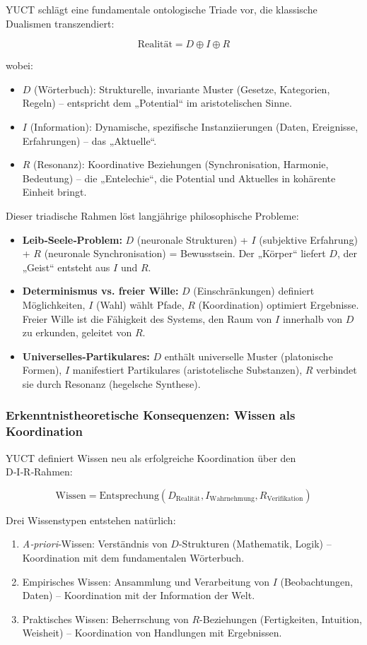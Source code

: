 \documentclass[12pt,a4paper]{article}
\begin{document}
	YUCT schlägt eine fundamentale ontologische Triade vor, die klassische Dualismen transzendiert:
	
	\[
	\text{Realität} = D \oplus I \oplus R
	\]
	
	wobei:
	\begin{itemize}
		\item $D$ (Wörterbuch): Strukturelle, invariante Muster (Gesetze, Kategorien, Regeln) – entspricht dem „Potential“ im aristotelischen Sinne.
		\item $I$ (Information): Dynamische, spezifische Instanziierungen (Daten, Ereignisse, Erfahrungen) – das „Aktuelle“.
		\item $R$ (Resonanz): Koordinative Beziehungen (Synchronisation, Harmonie, Bedeutung) – die „Entelechie“, die Potential und Aktuelles in kohärente Einheit bringt.
	\end{itemize}
	
	Dieser triadische Rahmen löst langjährige philosophische Probleme:
	
	\begin{itemize}
		\item \textbf{Leib‑Seele‑Problem:} $D$ (neuronale Strukturen) + $I$ (subjektive Erfahrung) + $R$ (neuronale Synchronisation) = Bewusstsein. Der „Körper“ liefert $D$, der „Geist“ entsteht aus $I$ und $R$.
		\item \textbf{Determinismus vs. freier Wille:} $D$ (Einschränkungen) definiert Möglichkeiten, $I$ (Wahl) wählt Pfade, $R$ (Koordination) optimiert Ergebnisse. Freier Wille ist die Fähigkeit des Systems, den Raum von $I$ innerhalb von $D$ zu erkunden, geleitet von $R$.
		\item \textbf{Universelles‑Partikulares:} $D$ enthält universelle Muster (platonische Formen), $I$ manifestiert Partikulares (aristotelische Substanzen), $R$ verbindet sie durch Resonanz (hegelsche Synthese).
	\end{itemize}
	
	\subsubsection{Erkenntnistheoretische Konsequenzen: Wissen als Koordination}
	
	YUCT definiert Wissen neu als erfolgreiche Koordination über den D‑I‑R‑Rahmen:
	
	\[
	\text{Wissen} = \text{Entsprechung}(D_{\text{Realität}}, I_{\text{Wahrnehmung}}, R_{\text{Verifikation}})
	\]
	
	Drei Wissenstypen entstehen natürlich:
	\begin{enumerate}
		\item \textit{A‑priori}‑Wissen: Verständnis von $D$-Strukturen (Mathematik, Logik) – Koordination mit dem fundamentalen Wörterbuch.
		\item Empirisches Wissen: Ansammlung und Verarbeitung von $I$ (Beobachtungen, Daten) – Koordination mit der Information der Welt.
		\item Praktisches Wissen: Beherrschung von $R$-Beziehungen (Fertigkeiten, Intuition, Weisheit) – Koordination von Handlungen mit Ergebnissen.
	\end{enumerate}
	
\end{document}
